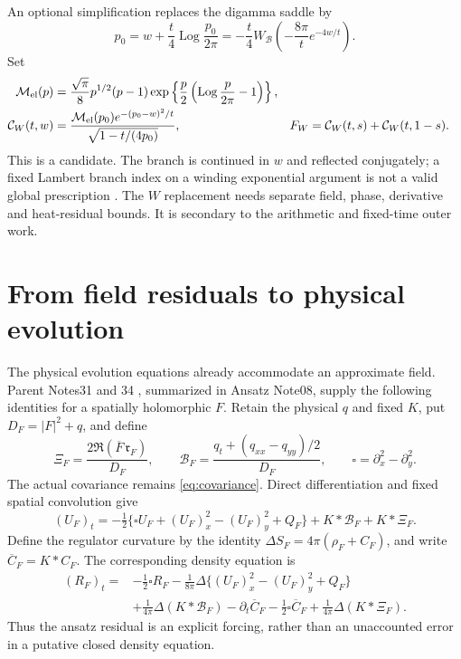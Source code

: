 \documentclass[11pt]{article}
\newcommand{\Mc}{\mathcal M}
\newcommand{\Log}{\operatorname{Log}}
\numberwithin{equation}{section}
\begin{document}
An optional simplification replaces the digamma saddle by
\begin{equation}
p_0=w+\frac t4\Log\frac{p_0}{2\pi}
 =-\frac t4W_{\mathcal B}\left(-\frac{8\pi}{t}e^{-4w/t}\right).
\label{eq:W-saddle}
\end{equation}
Set
\begin{align}
\Mc_{\rm el}(p)&=\frac{\sqrt\pi}{8}p^{1/2}(p-1)
 \exp\left\{\frac p2\left(\Log\frac p{2\pi}-1\right)\right\},\\
\mathcal C_W(t,w)&=
\frac{\Mc_{\rm el}(p_0)e^{-(p_0-w)^2/t}}
     {\sqrt{1-t/(4p_0)}},&
F_W&=\mathcal C_W(t,s)+\mathcal C_W(t,1-s).
\label{eq:W-field}
\end{align}
This is a candidate. The branch is continued in \(w\) and reflected
conjugately; a fixed Lambert branch index on a winding exponential
argument is not a valid global prescription \cite{dlmf-W}.
The \(W\) replacement needs separate field, phase, derivative and
heat-residual bounds. It is secondary to the arithmetic and fixed-time
outer work.




\section{From field residuals to physical evolution}
\label{sec:observable-evolution}
The physical evolution equations already accommodate an approximate
field. Parent Notes31 and 34 \cite{parent31,parent34}, summarized in
Ansatz Note08, supply the following identities for a spatially
holomorphic \(F\). Retain the physical \(q\) and fixed \(K\), put
\(D_F=|F|^2+q\), and define
\begin{equation}
 \Xi_F=\frac{2\Re(\overline F\,\mathfrak r_F)}{D_F},\qquad
 \mathcal B_F=\frac{q_t+(q_{xx}-q_{yy})/2}{D_F},\qquad
 \square=\partial_x^2-\partial_y^2.
 \label{eq:observable-forcing}
\end{equation}
The actual covariance remains \eqref{eq:covariance}. Direct
differentiation and fixed spatial convolution give
\begin{equation}
 (U_F)_t=-\tfrac12\{\square U_F+(U_F)_x^2-(U_F)_y^2+Q_F\}
           +K*\mathcal B_F+K*\Xi_F.
 \label{eq:forced-potential}
\end{equation}
Define the regulator curvature by the identity
\(\Delta S_F=4\pi(\rho_F+C_F)\), and write
\(\overline C_F=K*C_F\). The corresponding density equation is
\begin{equation}
\begin{split}
 (R_F)_t={}&-\tfrac12\square R_F
 -\frac1{8\pi}\Delta\{(U_F)_x^2-(U_F)_y^2+Q_F\}\\
 &+\frac1{4\pi}\Delta(K*\mathcal B_F)
   -\partial_t\overline C_F-\tfrac12\square\overline C_F
   +\frac1{4\pi}\Delta(K*\Xi_F).
\end{split}
\label{eq:forced-density}
\end{equation}
Thus the ansatz residual is an explicit forcing, rather than an
unaccounted error in a putative closed density equation.
\end{document}

